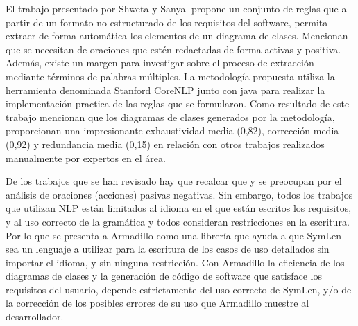 El trabajo presentado por Shweta y Sanyal \cite{Shweta2020} propone un conjunto de reglas que a partir de un formato no estructurado de los requisitos del software, permita extraer de forma automática los elementos de un diagrama de clases. Mencionan que se necesitan de oraciones que estén redactadas de forma activas y positiva. Además, existe un margen para investigar sobre el proceso de extracción mediante términos de palabras múltiples. La metodología propuesta utiliza la herramienta denominada Stanford CoreNLP junto con java para realizar la implementación practica de las reglas que se formularon. Como resultado de este trabajo mencionan que los diagramas de clases generados por la metodología, proporcionan una impresionante exhaustividad media (0,82), corrección media (0,92) y redundancia media (0,15) en relación con otros trabajos realizados manualmente por expertos en el área.  

De los trabajos que se han revisado hay que recalcar que \cite{Alashqar2021} y \cite{Shweta2020} se preocupan por el análisis de oraciones (acciones) pasivas negativas. Sin embargo, todos los trabajos que utilizan NLP están limitados al idioma en el que están escritos los requisitos, y al uso correcto de la gramática y todos consideran restricciones en la escritura. Por lo que se presenta a Armadillo como una librería que ayuda a que SymLen sea un lenguaje a utilizar para la escritura de los casos de uso detallados sin importar el idioma, y sin ninguna restricción. Con Armadillo la eficiencia de los diagramas de clases y la generación de código de software que satisface los requisitos del usuario, depende estrictamente del uso correcto de SymLen, y/o de la corrección de los posibles errores de su uso que Armadillo muestre al desarrollador.



